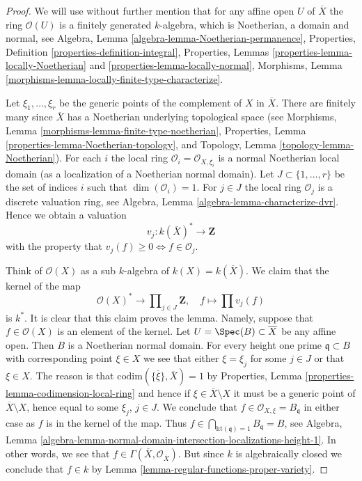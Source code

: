 \begin{proof}
We will use without further mention that for any affine open $U$ of
$\overline{X}$ the ring $\mathcal{O}(U)$ is a finitely generated
$k$-algebra, which is Noetherian, a domain and normal, see
Algebra, Lemma \ref{algebra-lemma-Noetherian-permanence},
Properties, Definition \ref{properties-definition-integral},
Properties, Lemmas \ref{properties-lemma-locally-Noetherian} and
\ref{properties-lemma-locally-normal},
Morphisms, Lemma \ref{morphisms-lemma-locally-finite-type-characterize}.

\medskip\noindent
Let $\xi_1, \ldots, \xi_r$ be the generic points of the complement of $X$
in $\overline{X}$. There are finitely many since $\overline{X}$ has a
Noetherian underlying topological space (see
Morphisms, Lemma \ref{morphisms-lemma-finite-type-noetherian},
Properties, Lemma \ref{properties-lemma-Noetherian-topology}, and
Topology, Lemma \ref{topology-lemma-Noetherian}).
For each $i$ the local ring $\mathcal{O}_i = \mathcal{O}_{X, \xi_i}$
is a normal Noetherian local domain (as a localization of a
Noetherian normal domain). Let $J \subset \{1, \ldots, r\}$ be the set of
indices $i$ such that $\dim(\mathcal{O}_i) = 1$. For $j \in J$ the
local ring $\mathcal{O}_j$ is a discrete valuation ring, see
Algebra, Lemma \ref{algebra-lemma-characterize-dvr}.
Hence we obtain a valuation
$$
v_j : k(\overline{X})^* \longrightarrow \mathbf{Z}
$$
with the property that $v_j(f) \geq 0 \Leftrightarrow f \in \mathcal{O}_j$.

\medskip\noindent
Think of $\mathcal{O}(X)$ as a sub $k$-algebra of $k(X) = k(\overline{X})$.
We claim that the kernel of the map
$$
\mathcal{O}(X)^* \longrightarrow
\prod\nolimits_{j \in J} \mathbf{Z},
\quad
f \longmapsto \prod v_j(f)
$$
is $k^*$. It is clear that this claim proves the lemma.
Namely, suppose that $f \in \mathcal{O}(X)$ is an element of the kernel.
Let $U = \Spec(B) \subset \overline{X}$ be any affine open.
Then $B$ is a Noetherian normal domain.
For every height one prime $\mathfrak q \subset B$ with corresponding
point $\xi \in X$ we see that either $\xi = \xi_j$ for some $j \in J$
or that $\xi \in X$. The reason is that
$\text{codim}(\overline{\{\xi\}}, \overline{X}) = 1$ by
Properties, Lemma \ref{properties-lemma-codimension-local-ring}
and hence if $\xi \in \overline{X} \setminus X$ it must be a
generic point of $\overline{X} \setminus X$, hence equal to some
$\xi_j$, $j \in J$.
We conclude that $f \in \mathcal{O}_{X, \xi} = B_{\mathfrak q}$
in either case as $f$ is in the kernel of the map. Thus
$f \in \bigcap_{\text{ht}(\mathfrak q) = 1} B_{\mathfrak q} = B$, see
Algebra, Lemma
\ref{algebra-lemma-normal-domain-intersection-localizations-height-1}.
In other words, we see that
$f \in \Gamma(\overline{X}, \mathcal{O}_{\overline{X}})$.
But since $k$ is algebraically closed we conclude that
$f \in k$ by
Lemma \ref{lemma-regular-functions-proper-variety}.
\end{proof}

